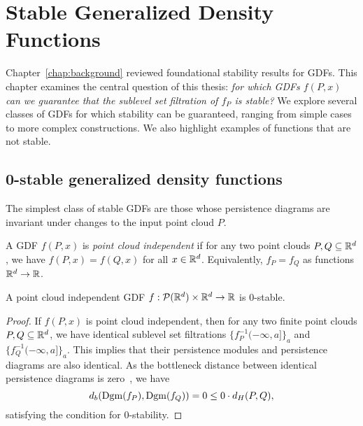 \chapter{Stable Generalized Density Functions}
\label{chap:stable_functions}

Chapter~\ref{chap:background} reviewed foundational stability results for GDFs.
This chapter examines the central question of this thesis: \emph{for which GDFs
$f(P, x)$ can we guarantee that the sublevel set filtration of $f_P$ is stable?}
We explore several classes of GDFs for which stability can be guaranteed,
ranging from simple cases to more complex constructions. We also highlight
examples of functions that are not stable.

\section{0-stable generalized density functions}

The simplest class of stable GDFs are those whose persistence diagrams are
invariant under changes to the input point cloud $P$.
\begin{definition}
    A GDF $f(P, x)$ is \emph{point cloud independent} if for any two point
    clouds $P, Q \subseteq \mathbb{R}^d$, we have $f(P, x) = f(Q, x)$ for all
    $x \in \mathbb{R}^d$. Equivalently, $f_P = f_Q$ as functions $\mathbb{R}^d \to \mathbb{R}$.
\end{definition}
\begin{theorem}
    A point cloud independent GDF $f : \mathcal{P}(\mathbb{R}^d) \times \mathbb{R}^d \to \mathbb{R}$
    is $0$-stable.
\end{theorem}
\begin{proof}
    If $f(P, x)$ is point cloud independent, then for any two finite point clouds
    $P, Q \subseteq \mathbb{R}^d$, we have identical sublevel set filtrations
    $\{f_P^{-1}(-\infty, a]\}_a$ and $\{f_Q^{-1}(-\infty, a]\}_a$.
    This implies that their persistence modules and persistence diagrams are
    also identical. As the bottleneck distance between identical persistence
    diagrams is zero~\cite{edelsbrunner2010computational}, we have
    \begin{equation}
        d_b(\operatorname{Dgm}(f_P), \operatorname{Dgm}(f_Q)) = 0 \leq 0 \cdot d_H(P, Q),
    \end{equation}
    satisfying the condition for $0$-stability.
\end{proof}

